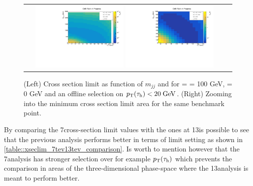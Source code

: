 \begin{figure}[tbh!]
	\centering
	\begin{tabular}{cc}
		\includegraphics[width=0.45\textwidth]{analysis/pics/JetInvMass_vs_MET_xsec_chi100_lsp000_taupt20.pdf}
		\includegraphics[width=0.45\textwidth]{analysis/pics/JetInvMass_vs_MET_xsec_chi100_lsp000_taupt20_zoom.pdf} 		
	\end{tabular}
	\caption{(Left) Cross section limit as function of $m_{jj}$ and \met for \charginopm = \neutralinotwo = 100 GeV, \neutralinoone = 0 GeV and an offline selection on $p_{\text{T}}(\tau_{\text{h}}) <  20\;\text{Ge}\kern-0.06667em\text{V}$. (Right) Zooming into the minimum cross section limit area for the same benchmark point.}
	\label{fig::xsec_lim_selected_results}
\end{figure}

By comparing the 7\tev cross-section limit values with the ones at 13\tev is possible to see that the previous analysis performs better in terms of limit setting as shown in \autoref{table::xseclim_7tev13tev_comparison}. Is worth to mention however that the 7\tev analysis has stronger selection over for example  $p_{\text{T}}(\tau_{\text{h}})$ which prevents the comparison in areas of the three-dimensional phase-space where the 13\tev analysis is meant to perform better.

